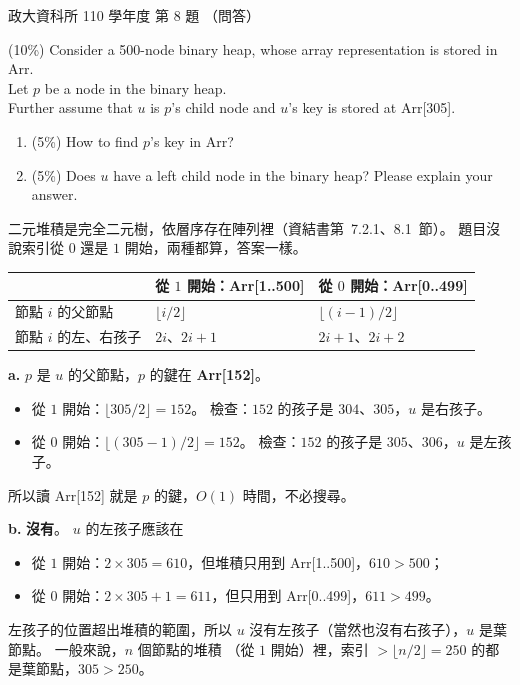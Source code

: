 \begin{pastexam}[label={px:nccu-110-dsa-08}]{政大資科所 110 學年度 第 8 題}
（問答）

(10\%) Consider a 500-node binary heap, whose array representation is stored in Arr.\\
Let $p$ be a node in the binary heap.\\
Further assume that $u$ is $p$'s child node and $u$'s key is stored at Arr[305].
\begin{enumerate}[label=\alph*.]
\item (5\%) How to find $p$'s key in Arr?
\item (5\%) Does $u$ have a left child node in the binary heap? Please explain your answer.
\end{enumerate}
\end{pastexam}

\begin{pastsoln}
二元堆積是完全二元樹，依層序存在陣列裡（資結書第~7.2.1、8.1~節）。 題目沒說索引從 $0$ 還是 $1$ 開始，兩種都算，答案一樣。

\begin{center}
\begin{tabular}{lll}
\toprule
 & 從 $1$ 開始：Arr[1..500] & 從 $0$ 開始：Arr[0..499] \\
\midrule
節點 $i$ 的父節點 & $\lfloor i/2 \rfloor$ & $\lfloor (i-1)/2 \rfloor$ \\
節點 $i$ 的左、右孩子 & $2i$、$2i + 1$ & $2i + 1$、$2i + 2$ \\
\bottomrule
\end{tabular}
\end{center}

\textbf{a.} $p$ 是 $u$ 的父節點，$p$ 的鍵在 \textbf{Arr[152]}。
\begin{itemize}
\item 從 $1$ 開始：$\lfloor 305/2 \rfloor = 152$。 檢查：$152$ 的孩子是 $304$、$305$，$u$ 是右孩子。
\item 從 $0$ 開始：$\lfloor (305-1)/2 \rfloor = 152$。 檢查：$152$ 的孩子是 $305$、$306$，$u$ 是左孩子。
\end{itemize}
所以讀 Arr[152] 就是 $p$ 的鍵，$O(1)$ 時間，不必搜尋。

\textbf{b.} \textbf{沒有}。 $u$ 的左孩子應該在
\begin{itemize}
\item 從 $1$ 開始：$2 \times 305 = 610$，但堆積只用到 Arr[1..500]，$610 > 500$；
\item 從 $0$ 開始：$2 \times 305 + 1 = 611$，但只用到 Arr[0..499]，$611 > 499$。
\end{itemize}
左孩子的位置超出堆積的範圍，所以 $u$ 沒有左孩子（當然也沒有右孩子），$u$ 是葉節點。 一般來說，$n$ 個節點的堆積
（從 $1$ 開始）裡，索引 $> \lfloor n/2 \rfloor = 250$ 的都是葉節點，$305 > 250$。
\end{pastsoln}
